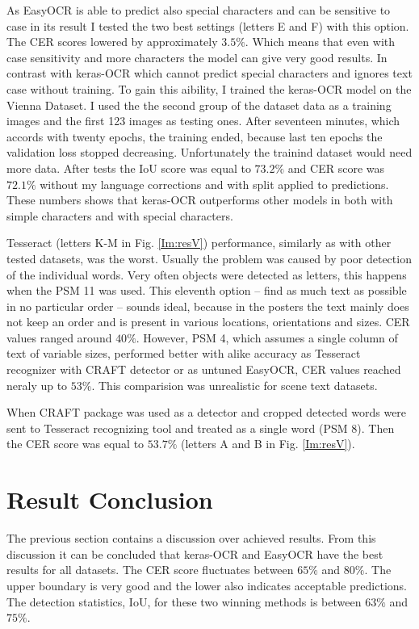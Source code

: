 As EasyOCR is able to predict also special characters and can be sensitive to case in its result I tested the two best settings (letters E and F) with this option. The CER scores lowered by approximately $3.5\%$. Which means that even with case sensitivity and more characters the model can give very good results. In contrast with keras-OCR which cannot predict special characters and ignores text case without training. To gain this aibility, I trained the keras-OCR model on the Vienna Dataset. I used the the second group of the dataset data as a training images and the first 123 images as testing ones. After seventeen minutes, which accords with twenty epochs, the training ended, because last ten epochs the validation loss stopped decreasing. Unfortunately the trainind dataset would need more data. After tests the IoU score was equal to $73.2\%$ and CER score was $72.1\%$ without my language corrections and with split applied to predictions. These numbers shows that keras-OCR outperforms other models in both with simple characters and with special characters.

Tesseract (letters K-M in Fig. \ref*{Im:resV}) performance, similarly as with other tested datasets, was the worst. Usually the problem was caused by poor detection of the individual words. Very often objects were detected as letters, this happens when the PSM 11 was used. This eleventh option --  find as much text as possible in no particular order -- sounds ideal, because in the posters the text mainly does not keep an order and is present in various locations, orientations and sizes. CER values ranged around $40\%$. However, PSM 4, which assumes a single column of text of variable sizes, performed better with alike accuracy as Tesseract recognizer with CRAFT detector or as untuned EasyOCR, CER values reached neraly up to $53\%$. This comparision was unrealistic for scene text datasets.

When CRAFT package was used as a detector and cropped detected words were sent to Tesseract recognizing tool and treated as a single word (PSM 8). Then the CER score was equal to $53.7\%$ (letters A and B in Fig. \ref*{Im:resV}).


\section*{Result Conclusion}

The previous section contains a discussion over achieved results. From this discussion it can be concluded that keras-OCR and EasyOCR have the best results for all datasets. The CER score fluctuates between $65\%$ and $80\%$. The upper boundary is very good and the lower also indicates acceptable predictions. The detection statistics, IoU, for these two winning methods is between $63\%$ and $75\%$.

